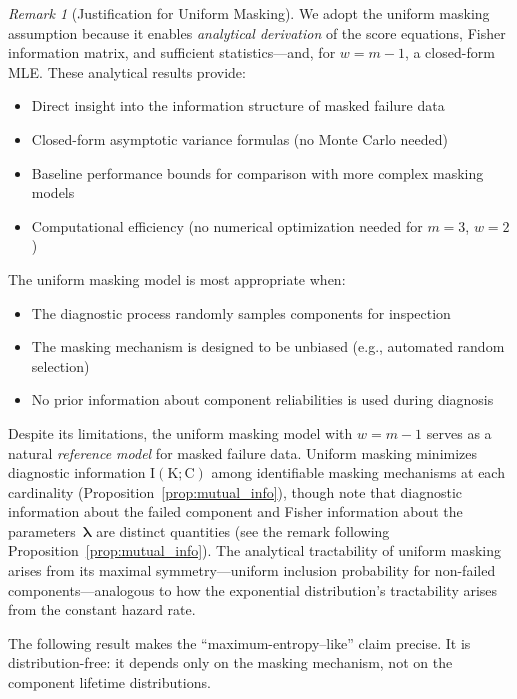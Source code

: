 \documentclass[12pt]{article}
\newcommand{\RV}[1]{\mathrm{#1}}
\newcommand{\cand}{\RV{C}}         %
\renewcommand{\vec}[1]{\boldsymbol{#1}}
\theoremstyle{definition}
\theoremstyle{remark}
\newtheorem{remark}[theorem]{Remark}
\begin{document}
\begin{remark}[Justification for Uniform Masking]
We adopt the uniform masking assumption because it enables \emph{analytical derivation} of the score equations, Fisher information matrix, and sufficient statistics---and, for $w = m-1$, a closed-form MLE. These analytical results provide:
\begin{itemize}
\item Direct insight into the information structure of masked failure data
\item Closed-form asymptotic variance formulas (no Monte Carlo needed)
\item Baseline performance bounds for comparison with more complex masking models
\item Computational efficiency (no numerical optimization needed for $m=3$, $w=2$)
\end{itemize}

The uniform masking model is most appropriate when:
\begin{itemize}
\item The diagnostic process randomly samples components for inspection
\item The masking mechanism is designed to be unbiased (e.g., automated random selection)
\item No prior information about component reliabilities is used during diagnosis
\end{itemize}

Despite its limitations, the uniform masking model with $w = m-1$ serves as a natural \emph{reference model} for masked failure data. Uniform masking minimizes diagnostic information $\RV{I}(\RV{K}; \cand)$ among identifiable masking mechanisms at each cardinality (Proposition~\ref{prop:mutual_info}), though note that diagnostic information about the failed component and Fisher information about the parameters~$\vec{\lambda}$ are distinct quantities (see the remark following Proposition~\ref{prop:mutual_info}). The analytical tractability of uniform masking arises from its maximal symmetry---uniform inclusion probability for non-failed components---analogous to how the exponential distribution's tractability arises from the constant hazard rate.
\end{remark}

The following result makes the ``maximum-entropy--like'' claim precise. It is distribution-free: it depends only on the masking mechanism, not on the component lifetime distributions.
\end{document}
